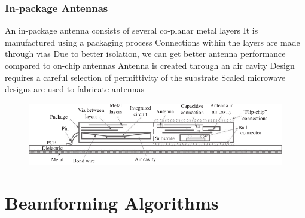 \documentclass[10pt]{beamer}
\begin{document}
\begin{frame}
    \frametitle{In-package Antennas}
    \begin{outline}
        \1 An in-package antenna consists of several co-planar metal layers
        \1 It is manufactured using a packaging process
        \1 Connections within the layers are made through vias
        \1 Due to better isolation, we can get better antenna performance compared to on-chip antennas
        \1 Antenna is created through an air cavity
        \1 Design requires a careful selection of permittivity of the substrate 
        \1 Scaled microwave designs are used to fabricate antennas
    \end{outline}
    \begin{figure}[htbp]
        \centering
        \includegraphics[width=.75\textwidth]{inpackage.pdf}
    \end{figure}
\end{frame}

\section{Beamforming Algorithms}
\end{document}
